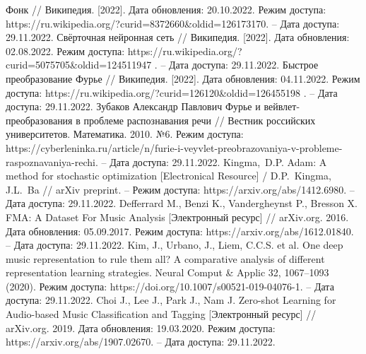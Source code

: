 \begin{thebibliography}{99}
 Фонк // Википедия. [2022]. Дата обновления: 20.10.2022. Режим доступа: https://ru.wikipedia.org/?curid=8372660\&oldid=126173170. -- Дата доступа: 29.11.2022.
 Свёрточная нейронная сеть // Википедия. [2022]. Дата обновления: 02.08.2022. Режим доступа: https://ru.wikipedia.org/?curid=5075705\&oldid=124511947 .  -- Дата доступа: 29.11.2022.
 Быстрое преобразование Фурье // Википедия. [2022]. Дата обновления: 04.11.2022. Режим доступа: https://ru.wikipedia.org/?curid=126120\&oldid=126455198 .  -- Дата доступа: 29.11.2022. 
 Зубаков Александр Павлович Фурье и вейвлет-преобразования в проблеме распознавания речи // Вестник российских университетов. Математика. 2010. №6. Режим доступа: https://cyberleninka.ru/article/n/furie-i-veyvlet-preobrazovaniya-v-probleme-raspoznavaniya-rechi.  -- Дата доступа: 29.11.2022.
 Kingma, D.P. Adam: A method for stochastic optimization [Electronical Resource] / D.P. Kingma, J.L. Ba // arXiv preprint. – Режим доступа: https://arxiv.org/abs/1412.6980. -- Дата доступа: 29.11.2022.
 Defferrard M., Benzi K., Vandergheynst P., Bresson X. FMA: A Dataset For Music Analysis [Электронный ресурс] // arXiv.org. 2016. Дата обновления: 05.09.2017. Режим доступа: https://arxiv.org/abs/1612.01840. -- Дата доступа: 29.11.2022.
 Kim, J., Urbano, J., Liem, C.C.S. et al. One deep music representation to rule them all? A comparative analysis of different representation learning strategies. Neural Comput \& Applic 32, 1067–1093 (2020). Режим доступа: https://doi.org/10.1007/s00521-019-04076-1. -- Дата доступа: 29.11.2022.
 Choi J., Lee J., Park J., Nam J. Zero-shot Learning for Audio-based Music Classification and Tagging [Электронный ресурс] // arXiv.org. 2019. Дата обновления: 19.03.2020. Режим доступа: https://arxiv.org/abs/1907.02670. -- Дата доступа: 29.11.2022.
\end{thebibliography}

